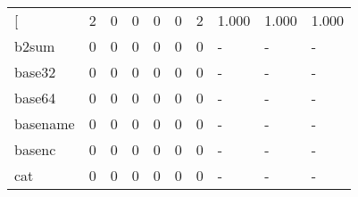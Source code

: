 \begin{longtable}{lp{2.0cm}p{2.0cm}p{2.0cm}p{2.0cm}p{2.0cm}p{2.0cm}p{2.0cm}p{2.0cm}p{2.0cm}}
\bottomrule
\endlastfoot
{[}         &                      2 &                                  0 &                                 0 &                                0 &                                 0 &                               2 &                                1.000 &                                  1.000 &                                1.000 \\
b2sum     &                      0 &                                  0 &                                 0 &                                0 &                                 0 &                               0 &                                    - &                                      - &                                    - \\
base32    &                      0 &                                  0 &                                 0 &                                0 &                                 0 &                               0 &                                    - &                                      - &                                    - \\
base64    &                      0 &                                  0 &                                 0 &                                0 &                                 0 &                               0 &                                    - &                                      - &                                    - \\
basename  &                      0 &                                  0 &                                 0 &                                0 &                                 0 &                               0 &                                    - &                                      - &                                    - \\
basenc    &                      0 &                                  0 &                                 0 &                                0 &                                 0 &                               0 &                                    - &                                      - &                                    - \\
cat       &                      0 &                                  0 &                                 0 &                                0 &                                 0 &                               0 &                                    - &                                      - &                                    - \\

\end{longtable}
